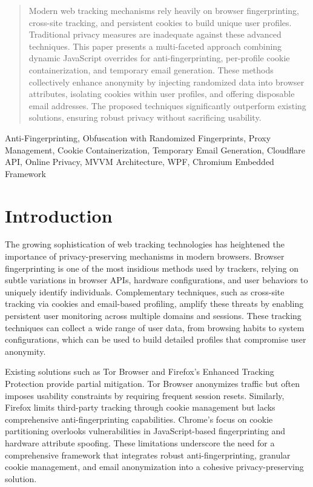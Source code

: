 \documentclass[conference]{IEEEtran}
\begin{document}
\begin{abstract}
Modern web tracking mechanisms rely heavily on browser fingerprinting, cross-site tracking, and persistent cookies to build unique user profiles. Traditional privacy measures are inadequate against these advanced techniques. This paper presents a multi-faceted approach combining dynamic JavaScript overrides for anti-fingerprinting, per-profile cookie containerization, and temporary email generation. These methods collectively enhance anonymity by injecting randomized data into browser attributes, isolating cookies within user profiles, and offering disposable email addresses. The proposed techniques significantly outperform existing solutions, ensuring robust privacy without sacrificing usability.
\end{abstract}

\begin{IEEEkeywords}
Anti-Fingerprinting, Obfuscation with Randomized Fingerprints, Proxy Management, Cookie Containerization, Temporary Email Generation, Cloudflare API, Online Privacy, MVVM Architecture, WPF, Chromium Embedded Framework

\end{IEEEkeywords}

\section{Introduction}
The growing sophistication of web tracking technologies has heightened the importance of privacy-preserving mechanisms in modern browsers. Browser fingerprinting is one of the most insidious methods used by trackers, relying on subtle variations in browser APIs, hardware configurations, and user behaviors to uniquely identify individuals. Complementary techniques, such as cross-site tracking via cookies and email-based profiling, amplify these threats by enabling persistent user monitoring across multiple domains and sessions. These tracking techniques can collect a wide range of user data, from browsing habits to system configurations, which can be used to build detailed profiles that compromise user anonymity.

Existing solutions such as Tor Browser and Firefox’s Enhanced Tracking Protection provide partial mitigation. Tor Browser anonymizes traffic but often imposes usability constraints by requiring frequent session resets. Similarly, Firefox limits third-party tracking through cookie management but lacks comprehensive anti-fingerprinting capabilities. Chrome’s focus on cookie partitioning overlooks vulnerabilities in JavaScript-based fingerprinting and hardware attribute spoofing. These limitations underscore the need for a comprehensive framework that integrates robust anti-fingerprinting, granular cookie management, and email anonymization into a cohesive privacy-preserving solution.
\end{document}
